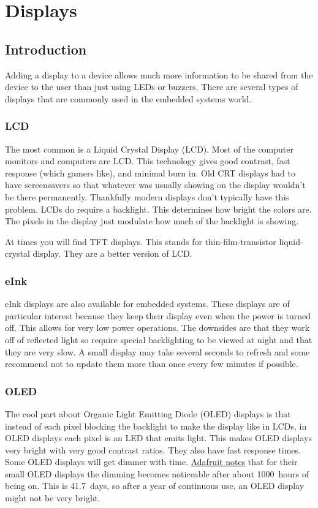 \chapter{Displays}

\section{Introduction}
Adding a display to a device allows much more information to be shared from the device to the user than 
just using LEDs or buzzers. There are several types of displays that are commonly used in the embedded systems 
world. 

\subsection{LCD}
The most common is a Liquid Crystal Display (LCD). Most of the computer monitors and computers are LCD. This 
technology gives good contrast, fast response (which gamers like), and minimal burn in. Old CRT displays had 
to have screensavers so that whatever was usually showing on the display wouldn't be there permanently. 
Thankfully modern displays don't typically have this problem. LCDs do require a backlight. This determines
how bright the colors are. The pixels in the display just modulate how much of the backlight is showing.

At times you will find TFT displays. This stands for thin-film-transistor liquid-crystal display. They are 
a better version of LCD.

\subsection{eInk}
eInk displays are also available for embedded systems. These displays are of particular interest because they keep their 
display even when the power is turned off. This allows for very low power operations. The downsides are 
that they work off of reflected light so require special backlighting to be viewed at night and that 
they are very slow. A small display may take several seconds to refresh and some recommend not to update
them more than once every few minutes if possible.

\subsection{OLED}
The cool part about Organic Light Emitting Diode (OLED) displays is that  
instead of each pixel blocking the backlight to make the display like in LCDs, in 
OLED displays each pixel is an LED that emits light. This makes OLED displays very bright with very 
good contrast ratios. They also have fast response times. Some OLED displays will get dimmer with time. 
\href{https://www.adafruit.com/product/938}{Adafruit notes} that for their small 
OLED displays the dimming becomes noticeable after about 1000~hours of being on. This is 41.7~days, 
so after a year of continuous use, an OLED display might not be very bright.

